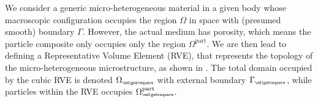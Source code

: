 \documentclass[12pt,a4paper]{article}
\renewcommand{\Box}{\mdlgwhtsquare}
\newcommand{\particle}{\mathrm{part}}
\newcommand{\rve}{
  {\mathchoice
   {\mbox{\scalebox{0.67}{$\Box$}}}
   {\mbox{\scalebox{0.67}{$\Box$}}}
   {\mbox{\scalebox{0.5}{$\Box$}}}
   {\mbox{\scalebox{0.375}{$\Box$}}}
  }
}
\begin{document}
We consider a generic micro-heterogeneous material in a given body whose macroscopic configuration occupies the region $\Omega$ in space with (presumed smooth) boundary $\Gamma$.
However, the actual medium has porosity, which means the particle composite only occupies only the region $\Omega^\particle$.
We are then lead to defining a Representative Volume Element (RVE), that represents the topology of the micro-heterogeneous microstructure, as shown in .
The total domain occupied by the cubic RVE is denoted $\Omega_\rve$ with external boundary $\Gamma_\rve$, while particles within the RVE occupies $\Omega_\rve^\particle$.
\begin{figure}
\centering
\end{figure}
\end{document}
